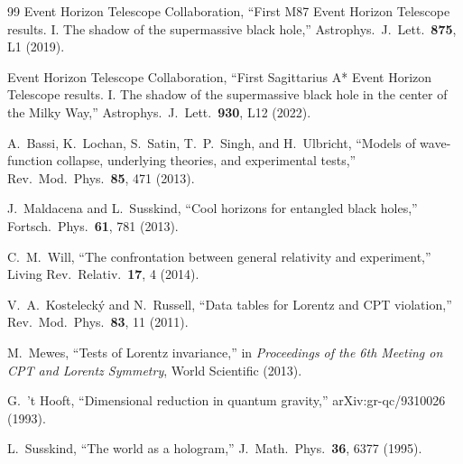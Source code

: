 \documentclass[aps,prd,twocolumn,showpacs,superscriptaddress,preprintnumbers]{revtex4-2}
\begin{document}
\begin{thebibliography}{99}
Event Horizon Telescope Collaboration,
``First M87 Event Horizon Telescope results. I. The shadow of the supermassive black hole,''
Astrophys.\ J.\ Lett.\ \textbf{875}, L1 (2019).

Event Horizon Telescope Collaboration,
``First Sagittarius A* Event Horizon Telescope results. I. The shadow of the supermassive black hole in the center of the Milky Way,''
Astrophys.\ J.\ Lett.\ \textbf{930}, L12 (2022).

A.~Bassi, K.~Lochan, S.~Satin, T.~P.~Singh, and H.~Ulbricht,
``Models of wave-function collapse, underlying theories, and experimental tests,''
Rev.\ Mod.\ Phys.\ \textbf{85}, 471 (2013).

J.~Maldacena and L.~Susskind,
``Cool horizons for entangled black holes,''
Fortsch.\ Phys.\ \textbf{61}, 781 (2013).

C.~M.~Will,
``The confrontation between general relativity and experiment,''
Living Rev.\ Relativ.\ \textbf{17}, 4 (2014).

V.~A.~Kosteleck{\'y} and N.~Russell,
``Data tables for Lorentz and CPT violation,''
Rev.\ Mod.\ Phys.\ \textbf{83}, 11 (2011).

M.~Mewes,
``Tests of Lorentz invariance,''
in \textit{Proceedings of the 6th Meeting on CPT and Lorentz Symmetry},
World Scientific (2013).

G.~'t Hooft,
``Dimensional reduction in quantum gravity,''
arXiv:gr-qc/9310026 (1993).

L.~Susskind,
``The world as a hologram,''
J.\ Math.\ Phys.\ \textbf{36}, 6377 (1995).

\end{thebibliography}
\end{document}
